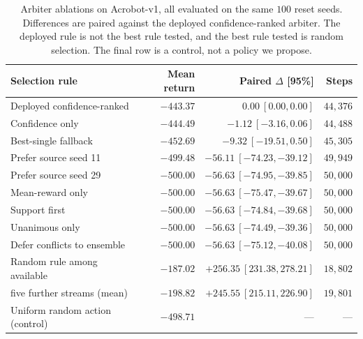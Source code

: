 \documentclass[11pt,a4paper]{article}
\begin{document}
\begin{table}[H]
\centering
\caption{Arbiter ablations on Acrobot-v1, all evaluated on the same $100$ reset seeds. Differences are paired against the deployed confidence-ranked arbiter. The deployed rule is not the best rule tested, and the best rule tested is random selection. The final row is a control, not a policy we propose.}
\label{tab:arb}
\footnotesize
\begin{tabular}{@{}lrrr@{}}
\toprule
\textbf{Selection rule} & \textbf{Mean return} & \textbf{Paired $\Delta$ [95\%]} & \textbf{Steps} \\
\midrule
Deployed confidence-ranked & $-443.37$ & $0.00\ [0.00,0.00]$ & $44{,}376$ \\
Confidence only & $-444.49$ & $-1.12\ [-3.16,0.06]$ & $44{,}488$ \\
Best-single fallback & $-452.69$ & $-9.32\ [-19.51,0.50]$ & $45{,}305$ \\
Prefer source seed 11 & $-499.48$ & $-56.11\ [-74.23,-39.12]$ & $49{,}949$ \\
Prefer source seed 29 & $-500.00$ & $-56.63\ [-74.95,-39.85]$ & $50{,}000$ \\
Mean-reward only & $-500.00$ & $-56.63\ [-75.47,-39.67]$ & $50{,}000$ \\
Support first & $-500.00$ & $-56.63\ [-74.84,-39.68]$ & $50{,}000$ \\
Unanimous only & $-500.00$ & $-56.63\ [-74.49,-39.36]$ & $50{,}000$ \\
Defer conflicts to ensemble & $-500.00$ & $-56.63\ [-75.12,-40.08]$ & $50{,}000$ \\
\midrule
Random rule among available & $-187.02$ & $+256.35\ [231.38,278.21]$ & $18{,}802$ \\
\quad five further streams (mean) & $-198.82$ & $+245.55\ [215.11,226.90]$ & $19{,}801$ \\
\midrule
Uniform random action (control) & $-498.71$ & --- & --- \\
\bottomrule
\end{tabular}
\end{table}
\end{document}

